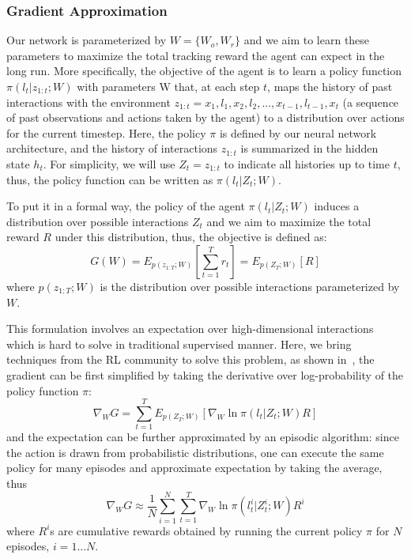 \documentclass[10pt,twocolumn,letterpaper]{article}
\begin{document}
\subsubsection{Gradient Approximation}
	Our network is parameterized by $W=\{W_o,W_r\}$ and we aim to learn these parameters to maximize the total tracking reward the agent can expect in the long run. More specifically, the objective of the agent is to learn a policy function $\pi(l_t|z_{1:t};W)$ with parameters W that, at each step $t$, maps the history of past interactions with the environment $z_{1:t}=x_1,l_1,x_2,l_2,...,x_{t-1},l_{t-1},x_t$ (a sequence of past observations and actions taken by the agent) to a distribution over actions for the current timestep. Here, the policy $\pi$ is defined by our neural network architecture, and the history of interactions $z_{1:t}$ is summarized in the hidden state $h_t$. For simplicity, we will use $Z_t=z_{1:t}$ to indicate all histories up to time $t$, thus, the policy function can be written as $\pi(l_t|Z_t;W)$.
    
    To put it in a formal way, the policy of the agent $\pi(l_t|Z_t;W)$ induces a distribution over possible interactions $Z_t$ and we aim to maximize the total reward $R$ under this distribution, thus, the objective is defined as:
\begin{equation}
	G(W)=E_{p(z_{1:T};W)}[\sum_{t=1}^{T}r_t]=E_{p(Z_T;W)}[R]
    \label{eq:rlagentori}
\end{equation}
where $p(z_{1:T};W)$ is the distribution over possible interactions parameterized by $W$.
    
    This formulation involves an expectation over high-dimensional interactions which is hard to solve in traditional supervised manner. Here, we bring techniques from the RL community to solve this problem, as shown in~\cite{williams1992simple}, the gradient can be first simplified by taking the derivative over log-probability of the policy function $\pi$:
\begin{equation}
	\nabla_{W}G=\sum_{t=1}^{T}E_{p(Z_T;W)}[\nabla_{W}\ln\pi(l_t|Z_t;W)R]
    \label{eq:gradientfirst}
\end{equation}
and the expectation can be further approximated by an episodic algorithm: since the action is drawn from probabilistic distributions, one can execute the same policy for many episodes and approximate expectation by taking the average, thus
\begin{equation}
	\nabla_{W}G\approx\frac{1}{N}\sum_{i=1}^{N}\sum_{t=1}^{T}\nabla_{W}\ln\pi(l_t^i|Z_t^i;W)R^i
    \label{eq:gradientsecond}
\end{equation}
where $R^i$s are cumulative rewards obtained by running the current policy $\pi$ for $N$ episodes, $i=1...N$. 
    
\end{document}
